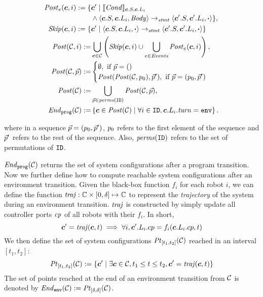 \vspace{1mm}
\begin{mdframed}[
    innertopmargin=0pt,
    innerleftmargin=0pt, innerrightmargin=0pt
]
\footnotesize
\newcommand{\Skip}{\mathit{Skip}\xspace}
\begin{align*}
    \Post_\Ev(\gconfig,i) := \{& \gconfig' \mid \eec{\EvCond}{\gconfig.S, \gconfig.\lconfig{i}} \\
      & \land \left\langle \gconfig.S, \gconfig.\lconfig{i}, \EvBody \right\rangle \stmtrule \left\langle \gconfig'.S, \gconfig'.\lconfig{i}, \EndEvent \right\rangle\}, \\
    \Skip(\gconfig,i) := \{& \gconfig' \mid \left\langle \gconfig.S, \gconfig.\lconfig{i}, \EndEvent \right\rangle \stmtrule \left\langle \gconfig'.S, \gconfig'.\lconfig{i}, \EndEvent \right\rangle \} \\
    \Post(\gset,i) := & \bigcup_{\gconfig\in\gset} \left(\Skip(\gconfig, i) \cup \bigcup_{\Ev \in \Event} \Post_\Ev(\gconfig, i) \right),\\
    \Post(\gset,\pvec) := &
        \begin{cases}
            \emptyset, \text{ if } \pvec=()\\
            \Post(\Post(\gset,\pinit),\pvec'), \text{ if } \pvec=(\pinit, \pvec')\\
        \end{cases}\\
    \Post(\gset) := & \bigcup_{\pvec\in \mathit{perms}(\UINS)} \Post(\gset,\pvec), \\
    \Final(\gset) := & \left\{ \gconfig\in \Post(\gset)\mid \forall i \in \UINS, \gconfig.\lconfig{i}.\turn = \env \right\}.
\end{align*}
\end{mdframed}
where in a sequence $\vec{p}=(p_0, \vec{p}')$, $p_0$ refers to the first element of the sequence and $\vec{p}'$ refers to the rest of the sequence.
Also, $\mathit{perms}(\texttt{ID})$ refers to the set of permutations of $\texttt{ID}$.

$\mathit{End}_{\mathtt{prog}}(\mathcal{C})$ returns the set of system configurations after a program transition.
Now we further define how to compute reachable system configurations after an environment transition.
Given the black-box function $f_i$ for each robot $i$,
we can define the function $\mathit{traj}: \mathbb{C} \times \left[0,\delta\right] \mapsto \mathbb{C}$ to represent the \emph{trajectory} of the system during an environment transition.
$\mathit{traj}$ is constructed by simply update all controller ports $\mathit{cp}$ of all robots with their $f_i$.
In short,
\[
\mathit{\boldsymbol{c}}' = \mathit{traj}(\mathit{\boldsymbol{c}}, t) \implies \forall i, \mathit{\boldsymbol{c}}'.L_{i}.cp = f_i(\mathit{\boldsymbol{c}}.L_{i}.cp, t)
\]
We then define the set of system configurations $\mathit{Pt}_{[t_1,t_2]}(\mathcal{C})$ reached in an interval $[t_1,t_2]$:
\[
\mathit{Pt}_{[t_1,t_2]}(\mathcal{C}) := \left\{\mathit{\boldsymbol{c}}' \mid \exists \mathit{\boldsymbol{c}}\in \mathcal{C}, t_1 \leq t\leq t_2 , \mathit{\boldsymbol{c}}' = \mathit{traj}(\mathit{\boldsymbol{c}},t)\right\}
\]
The set of points reached at the end of an environment transition from $\mathcal{C}$ is denoted by  $\mathit{End}_{\mathtt{env}}(\mathcal{C}) := \mathit{Pt}_{[\delta,\delta]}(\mathcal{C})$.

